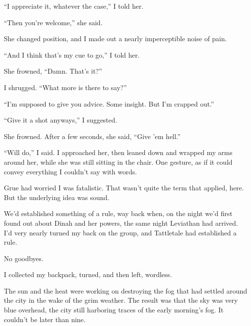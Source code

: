 ``I appreciate it, whatever the case,'' I told her.



``Then you're welcome,'' she said.



She changed position, and I made out a nearly imperceptible noise of pain.



``And I think that's my cue to go,'' I told her.



She frowned, ``Damn.  That's it?''



I shrugged.  ``What more is there to say?''



``I'm supposed to give you advice.  Some insight.  But I'm crapped out.''



``Give it a shot anyways,'' I suggested.



She frowned.  After a few seconds, she said, ``Give 'em hell.''



``Will do,'' I said.  I approached her, then leaned down and wrapped my arms around her, while she was still sitting in the chair.  One gesture, as if it could convey everything I couldn't say with words.



Grue had worried I was fatalistic.  That wasn't quite the term that applied, here.  But the underlying idea was sound.



We'd established something of a rule, way back when, on the night we'd first found out about Dinah and her powers, the same night Leviathan had arrived.  I'd very nearly turned my back on the group, and Tattletale had established a rule.



No goodbyes.



I collected my backpack, turned, and then left, wordless.



The sun and the heat were working on destroying the fog that had settled around the city in the wake of the grim weather.  The result was that the sky was very blue overhead, the city still harboring traces of the early morning's fog.  It couldn't be later than nine.



